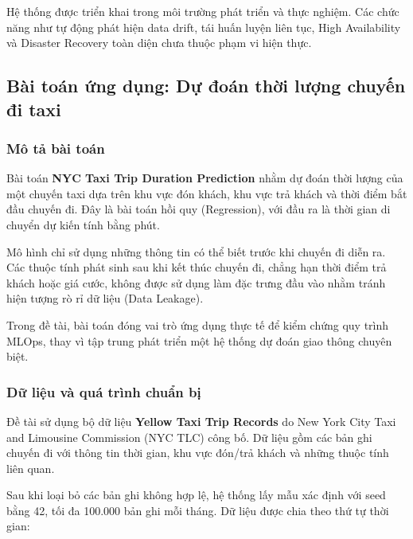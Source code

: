 Hệ thống được triển khai trong môi trường phát triển và thực nghiệm. Các chức năng như tự động phát hiện data drift, tái huấn luyện liên tục, High Availability và Disaster Recovery toàn diện chưa thuộc phạm vi hiện thực.


\subsection{Bài toán ứng dụng: Dự đoán thời lượng chuyến đi taxi}


\subsubsection{Mô tả bài toán}


Bài toán \textbf{NYC Taxi Trip Duration Prediction} nhằm dự đoán thời lượng của một chuyến taxi dựa trên khu vực đón khách, khu vực trả khách và thời điểm bắt đầu chuyến đi. Đây là bài toán hồi quy (Regression), với đầu ra là thời gian di chuyển dự kiến tính bằng phút.


Mô hình chỉ sử dụng những thông tin có thể biết trước khi chuyến đi diễn ra. Các thuộc tính phát sinh sau khi kết thúc chuyến đi, chẳng hạn thời điểm trả khách hoặc giá cước, không được sử dụng làm đặc trưng đầu vào nhằm tránh hiện tượng rò rỉ dữ liệu (Data Leakage).


Trong đề tài, bài toán đóng vai trò ứng dụng thực tế để kiểm chứng quy trình MLOps, thay vì tập trung phát triển một hệ thống dự đoán giao thông chuyên biệt.


\subsubsection{Dữ liệu và quá trình chuẩn bị}


Đề tài sử dụng bộ dữ liệu \textbf{Yellow Taxi Trip Records} do New York City Taxi and Limousine Commission (NYC TLC) công bố. Dữ liệu gồm các bản ghi chuyến đi với thông tin thời gian, khu vực đón/trả khách và những thuộc tính liên quan.


Sau khi loại bỏ các bản ghi không hợp lệ, hệ thống lấy mẫu xác định với seed bằng 42, tối đa 100.000 bản ghi mỗi tháng. Dữ liệu được chia theo thứ tự thời gian:



